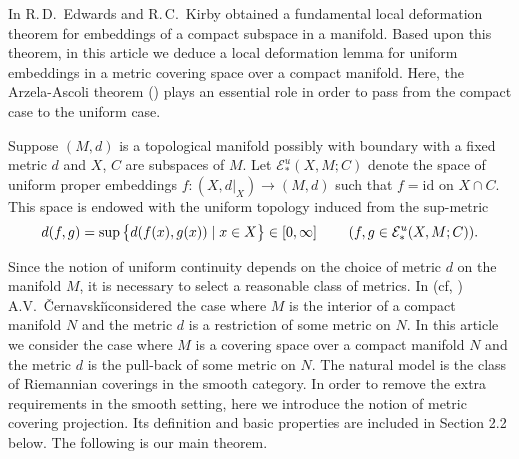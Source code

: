 \documentclass[11pt, fleqn]{amsart}
\theoremstyle{definition}
\newcommand{\id}{\mathrm{id}}
\newcommand{\E}{\mathcal E}
\begin{document}
In \cite{EK}  R.\,D.~Edwards and R.\,C.~Kirby obtained a fundamental local deformation theorem for embeddings of a compact subspace in a manifold. 
Based upon this theorem, in this article we deduce a local deformation lemma for uniform embeddings in a metric covering space over a compact manifold. 
Here, the Arzela-Ascoli theorem (\cite[Theorem 6.4]{Du}) plays an essential role in order to pass from the compact case to the uniform case. 

Suppose $(M, d)$ is a topological manifold possibly with boundary with a fixed metric $d$ and $X$, $C$ are subspaces of $M$. 
Let $\E^u_\ast(X, M; C)$ denote the space of uniform proper embeddings $f : (X, d|_X) \to (M, d)$ such that $f = \id$ on $X \cap C$. 
This space is endowed with the uniform topology induced from the  sup-metric 
$$d(f,g) = \sup \big\{ d(f(x), g(x)) \mid x \in X \big\} \in [0, \infty] \hspace{8mm} (f, g \in \E^u_\ast(X, M; C)).$$ 

Since the notion of uniform continuity depends on the choice of metric $d$ on the manifold $M$, 
it is necessary to select a reasonable class of metrics. 
In \cite{Ce} (cf, \cite[Section 5.6]{Ru}) A.V.~{\v C}ernavski\u\i \break considered the case where $M$ is the interior of a compact manifold $N$ and the metric $d$ is a restriction of some metric on $N$. 
In this article we consider the case where $M$ is a covering space over a compact manifold $N$ and the metric $d$ is the pull-back of some metric on $N$. 
The natural model is the class of Riemannian coverings in the smooth category. 
In order to remove the extra requirements in the smooth setting, here we introduce the notion of metric covering projection. 
Its definition and basic properties are included in Section 2.2 below.  
The following is our main theorem. 
\end{document}
